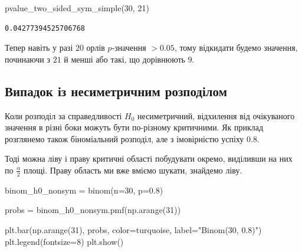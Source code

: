 \documentclass[
  letterpaper,
  10pt,
  openany]{report}
\newenvironment{Shaded}{\begin{snugshade}}{\end{snugshade}}
\newcommand{\DecValTok}[1]{\textcolor[rgb]{0.68,0.00,0.00}{#1}}
\newcommand{\FloatTok}[1]{\textcolor[rgb]{0.68,0.00,0.00}{#1}}
\newcommand{\NormalTok}[1]{\textcolor[rgb]{0.00,0.23,0.31}{#1}}
\newcommand{\OperatorTok}[1]{\textcolor[rgb]{0.37,0.37,0.37}{#1}}
\newcommand{\StringTok}[1]{\textcolor[rgb]{0.13,0.47,0.30}{#1}}
\theoremstyle{definition}
\theoremstyle{remark}
\begin{document}
\begin{Shaded}
\begin{Highlighting}[]
\NormalTok{pvalue\_two\_sided\_sym\_simple(}\DecValTok{30}\NormalTok{, }\DecValTok{21}\NormalTok{)}
\end{Highlighting}
\end{Shaded}

\begin{verbatim}
0.04277394525706768
\end{verbatim}

Тепер навіть у разі \(20\) орлів \(p\)-значення \(> 0.05\), тому
відкидати будемо значення, починаючи з \(21\) й менші або такі, що
дорівнюють \(9\).

\subsection{Випадок із несиметричним
розподілом}\label{ux432ux438ux43fux430ux434ux43eux43a-ux456ux437-ux43dux435ux441ux438ux43cux435ux442ux440ux438ux447ux43dux438ux43c-ux440ux43eux437ux43fux43eux434ux456ux43bux43eux43c}

Коли розподіл за справедливості \(H_0\) несиметричний, відхилення від
очікуваного значення в різні боки можуть бути по-різному критичними. Як
приклад розглянемо також біноміальний розподіл, але з імовірністю успіху
\(0.8\).

Тоді можна ліву і праву критичні області побудувати окремо, виділивши на
них по \(\frac{\alpha}{2}\) площі. Праву область ми вже вміємо шукати,
знайдемо ліву.

\begin{Shaded}
\begin{Highlighting}[]
\NormalTok{binom\_h0\_nonsym }\OperatorTok{=}\NormalTok{ binom(n}\OperatorTok{=}\DecValTok{30}\NormalTok{, p}\OperatorTok{=}\FloatTok{0.8}\NormalTok{)}

\NormalTok{probs }\OperatorTok{=}\NormalTok{ binom\_h0\_nonsym.pmf(np.arange(}\DecValTok{31}\NormalTok{))}

\NormalTok{plt.bar(np.arange(}\DecValTok{31}\NormalTok{), probs, color}\OperatorTok{=}\NormalTok{turquoise, label}\OperatorTok{=}\StringTok{"Binom(30, 0.8)"}\NormalTok{)}
\NormalTok{plt.legend(fontsize}\OperatorTok{=}\DecValTok{8}\NormalTok{)}
\NormalTok{plt.show()}
\end{Highlighting}
\end{Shaded}
\end{document}
